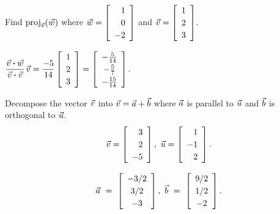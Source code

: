 \documentclass{ximera}
\begin{document}
  \begin{example}
    Find $\text{proj}_{\vec{v}}(\vec{w})$ where
    $\vect{w}=\startmat{r}
      1 \\
      0 \\
      -2
    \stopmat$ and $\vect{v}=\startmat{r}
      1 \\
      2 \\
      3
    \stopmat$.
    \begin{solution}
      $\displaystyle
      \def\arraystretch{1.2}
      \frac{\vect{v}\dotprod \vect{w}}{\vect{v}\dotprod
        \vect{v}}\,\vect{v}=\frac{-5}{14}\startmat{r}
        1 \\
        2 \\
        3
      \stopmat =\startmat{c}
        -\frac{5}{14} \\
        -\frac{5}{7} \\
        -\frac{15}{14}
      \stopmat$.
    \end{solution}
  \end{example}
  
  \begin{example}
    Decompose the vector $\vec{v}$ into $\vec{v}=\vec{a}+\vec{b}$
    where $\vec{a}$ is parallel to $\vec{u}$ and $\vec{b}$ is
    orthogonal to $\vec{u}$.
    \begin{equation*}
      \vect{v} = \startmat{r} 3\\2\\-5 \stopmat,\quad
      \vect{u} = \startmat{r} 1\\-1\\2 \stopmat.
    \end{equation*}
  
    \begin{solution}
      \begin{equation*}
        \vect{a} ~=~ \startmat{c} -3/2\\3/2\\-3 \stopmat,\quad
        \vect{b} ~=~ \startmat{c} 9/2\\1/2\\-2 \stopmat.
      \end{equation*}
    \end{solution}
  \end{example}
  
\end{document}
